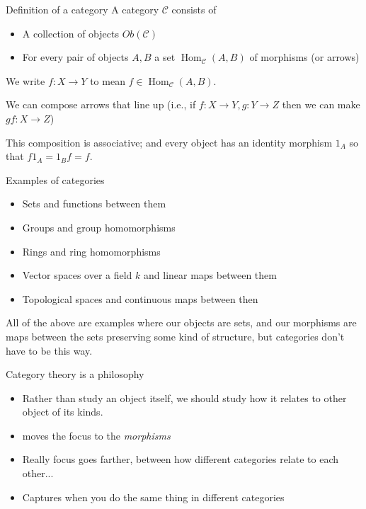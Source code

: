 \documentclass{beamer}
\DeclareMathOperator{\Hom}{\text{Hom}}
\begin{document}
\begin{frame}{Definition of a category}
  A category $\mathcal{C}$ consists of
  \begin{itemize}
  \item A collection of objects $Ob(\mathcal{C})$
  \item For every pair of objects $A, B$ a set $\Hom_{\mathcal{C}}(A,B)$ of morphisms (or arrows)
  \end{itemize}
  We write $f:X\to Y$ to mean $f\in \Hom_{\mathcal{C}}(A,B)$.
 
  We can compose arrows that line up (i.e., if $f:X\to Y, g:Y\to Z$ then we can make $gf:X\to Z$)

  This composition is associative; and every object has an identity morphism $1_A$ so that $f1_A=1_Bf=f$.

\end{frame}

\begin{frame}{Examples of categories}
  \begin{itemize}
  \item Sets and functions between them
  \item Groups and group homomorphisms
  \item Rings and ring homomorphisms
  \item Vector spaces over a field $k$ and linear maps between them
  \item Topological spaces and continuous maps between then
  \end{itemize}
  All of the above are examples where our objects are sets, and our morphisms are maps between the sets preserving some kind of structure, but categories don't have to be this way.
\end{frame}

\begin{frame}{Category theory is a philosophy}
  \begin{itemize}
    \item Rather than study an object itself, we should study how it relates to other object of its kinds.
    \item moves the focus to the \emph{morphisms}
    \item Really focus goes farther, between how different categories relate to each other...
    \item Captures when you do the same thing in different categories 
  \end{itemize}
\end{frame}
\end{document}

